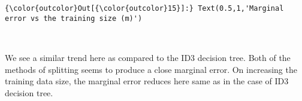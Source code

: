 \documentclass[11pt]{article}
\begin{document}
\begin{Verbatim}[commandchars=\\\{\}]
{\color{outcolor}Out[{\color{outcolor}15}]:} Text(0.5,1,'Marginal error vs the training size (m)')
\end{Verbatim}
            
    \begin{center}
    \end{center}
    { \hspace*{\fill} \\}
    
    We see a similar trend here as compared to the ID3 decision tree. Both
of the methods of splitting seems to produce a close marginal error. On
increasing the training data size, the marginal error reduces here same
as in the case of ID3 decision tree.


    
    
    
    
\end{document}
